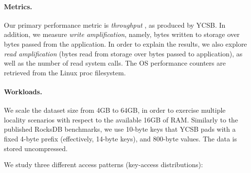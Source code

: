 \paragraph{Metrics.} Our primary performance metric is \emph{throughput} 
, 
as produced by YCSB. 
In addition, we measure \emph{write amplification}, namely, bytes written to storage over bytes passed from the application. 
In order to explain the results, we also explore \emph{read amplification} (bytes read from storage over bytes passed to application), 
as well as the number of read  system calls. The OS performance counters are retrieved from the Linux
proc filesystem. 

\paragraph{Workloads.} 
We scale the dataset size from 4GB to 64GB, in order to exercise multiple locality 
scenarios with respect to the available 16GB of RAM. Similarly to the published RocksDB benchmarks, we use 
10-byte keys that YCSB pads with a fixed 4-byte prefix (effectively, 14-byte keys), and 800-byte values. 
The data is stored uncompressed. 

We study three different access patterns (key-access distributions):  

